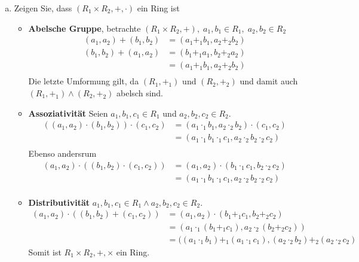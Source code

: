   \begin{enumerate}[a)]
    \item Zeigen Sie, dass $(R_1 \times R_2, +, \cdot)$ ein Ring ist

    \begin{itemize}
      \item \textbf{Abelsche Gruppe}, betrachte $(R_1 \times R_2, +), \; a_1, b_1 \in R_1, \; a_2, b_2 \in R_2$
      \begin{align*}
        (a_1, a_2) + (b_1, b_2) &= (a_1 +_1 b_1, a_2 +_2 b_2) \\
        (b_1, b_2) + (a_1, a_2) &= (b_1 +_1 a_1, b_2 +_2 a_2) \\
        &= (a_1 +_1 b_1, a_2 +_2 b_2) \\
      \end{align*}
      Die letzte Umformung gilt, da $(R_1, +_1)$ und $(R_2, +_2)$ und damit auch $(R_1, +_1) \land (R_2, +_2)$ abelsch sind.

      \item \textbf{Assoziativität}
      Seien $a_1, b_1, c_1 \in R_1$ und $a_2, b_2, c_2 \in R_2$.
      \begin{align*}
        ((a_1, a_2) \cdot (b_1, b_2)) \cdot (c_1, c_2) &= (a_1 \cdot_1 b_1, a_2 \cdot_2 b_2)\cdot (c_1, c_2) \\
        &= (a_1 \cdot_1 b_1 \cdot_1 c_1, a_2 \cdot_2 b_2 \cdot_2 c_2) \\
      \end{align*}
      Ebenso andersrum
      \begin{align*}
        (a_1, a_2) \cdot ((b_1, b_2) \cdot (c_1, c_2)) &= (a_1, a_2) \cdot (b_1 \cdot_1 c_1, b_2 \cdot_2 c_2) \\
        &= (a_1 \cdot_1 b_1 \cdot_1 c_1, a_2 \cdot_2 b_2 \cdot_2 c_2) \\
      \end{align*}

      \item \textbf{Distributivität}
        $a_1, b_1, c_1 \in R_1 \land a_2, b_2, c_2 \in R_2$.
        \begin{align*}
          (a_1, a_2) \cdot ((b_1, b_2)+(c_1, c_2)) &= (a_1, a_2)\cdot (b_1 +_1 c_1, b_2 +_2 c_2) \\
          &=(a_1 \cdot_1 (b_1 +_1 c_1 ), a_2 \cdot_2 (b_2 +_2 c_2))\\
          &=((a_1 \cdot_1 b_1) +_1 (a_1 \cdot_1 c_1), (a_2 \cdot_2 b_2) +_2 (a_2 \cdot_2 c_2)
        \end{align*}
        Somit ist $R_1 \times R_2, + , \times$ ein Ring.



    \end{itemize}
  \end{enumerate}

